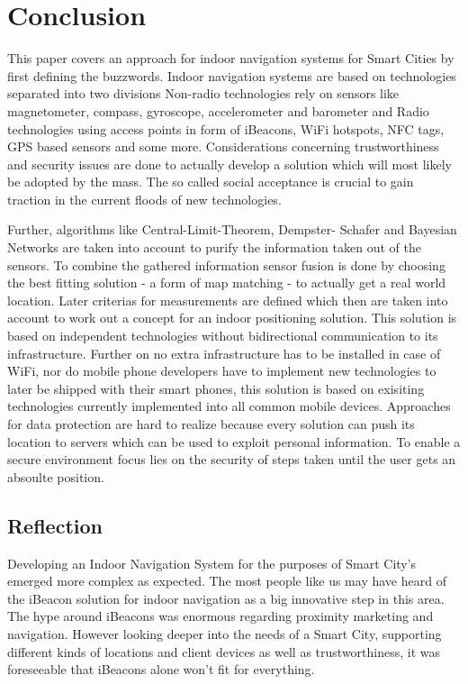 \clearpage
\section{Conclusion}
This paper covers an approach for indoor navigation systems for Smart Cities by first defining the buzzwords. Indoor navigation systems are based on technologies separated into two divisions  Non-radio technologies rely on sensors like magnetometer, compass, gyroscope, accelerometer and barometer and Radio technologies using access points in form of iBeacons, WiFi hotspots, NFC tags, GPS based sensors and some more. Considerations concerning trustworthiness and security issues are done to actually develop a solution which will most likely be adopted by the mass. The so called social acceptance is crucial to gain traction in the current floods of new technologies. 

Further, algorithms like Central-Limit-Theorem, Dempster- Schafer and Bayesian Networks are taken into account to purify the information taken out of the sensors. To combine the gathered information sensor fusion is done by choosing the best fitting solution - a form of map matching - to actually get a real world location. Later criterias for measurements are defined which then are taken into account to work out a concept for an indoor positioning solution. This solution is based on independent technologies without bidirectional communication to its infrastructure. Further on no extra infrastructure has to be installed in case of WiFi, nor do mobile phone developers have to implement new technologies to later be shipped with their smart phones, this solution is based on exisiting technologies currently implemented into all common mobile devices. Approaches for data protection are hard to realize because every solution can push its location to servers which can be used to exploit personal information. To enable a secure environment focus lies on the security of steps taken until the user gets an absoulte position.


\subsection{Reflection}
Developing an Indoor Navigation System for the purposes of Smart City's emerged more complex as expected. The most people like us may have heard of the iBeacon solution for indoor navigation as a big innovative step in this area. The hype around iBeacons was enormous regarding proximity marketing and navigation. However looking deeper into the needs of a Smart City, supporting different kinds of locations and client devices as well as trustworthiness, it was foreseeable that iBeacons alone won't fit for everything.

